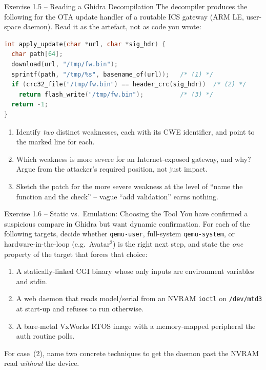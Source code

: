 \documentclass[11pt,a4paper]{article}
\begin{document}
\begin{taskbox}{Exercise 1.5 -- Reading a Ghidra Decompilation}
The decompiler produces the following for the OTA update handler of a routable ICS gateway
(ARM LE, user-space daemon). Read it as the artefact, not as code you wrote:
\begin{lstlisting}[language=C]
int apply_update(char *url, char *sig_hdr) {
  char path[64];
  download(url, "/tmp/fw.bin");
  sprintf(path, "/tmp/%s", basename_of(url));   /* (1) */
  if (crc32_file("/tmp/fw.bin") == header_crc(sig_hdr))  /* (2) */
    return flash_write("/tmp/fw.bin");          /* (3) */
  return -1;
}
\end{lstlisting}
\begin{enumerate}\setlength{\itemsep}{0pt}
  \item Identify \emph{two} distinct weaknesses, each with its CWE identifier, and point to the
        marked line for each.
  \item Which weakness is more severe for an Internet-exposed gateway, and why? Argue from the
        attacker's required position, not just impact.
  \item Sketch the patch for the more severe weakness at the level of ``name the function and
        the check'' -- vague ``add validation'' earns nothing.
\end{enumerate}
\end{taskbox}

\begin{taskbox}{Exercise 1.6 -- Static vs.\ Emulation: Choosing the Tool}
You have confirmed a suspicious compare in Ghidra but want dynamic confirmation. For each of the
following targets, decide whether \texttt{qemu-user}, full-system \texttt{qemu-system}, or
hardware-in-the-loop (e.g.\ Avatar$^2$) is the right next step, and state the \emph{one} property
of the target that forces that choice:
\begin{enumerate}\setlength{\itemsep}{0pt}
  \item A statically-linked CGI binary whose only inputs are environment variables and stdin.
  \item A web daemon that reads model/serial from an NVRAM \texttt{ioctl} on \texttt{/dev/mtd3}
        at start-up and refuses to run otherwise.
  \item A bare-metal VxWorks RTOS image with a memory-mapped peripheral the auth routine polls.
\end{enumerate}
For case~(2), name two concrete techniques to get the daemon past the NVRAM read \emph{without}
the device.
\end{taskbox}
\end{document}
